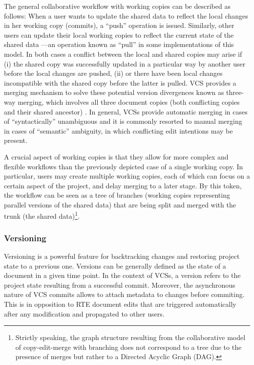 \documentclass{sig-alternate}
\begin{document}
The general collaborative workflow with working copies can be described as follows:
When a user wants to update the shared data to reflect the local changes in her working copy
(commits), a ``push'' operation is issued. Similarly, other users can update their local
working copies to reflect the current state of the shared data ---an operation
known as ``pull'' in some implementations of this model.
In both cases a conflict between the local and shared copies may arise if (i) the shared
copy was successfully updated in a particular way by another user before the local changes
are pushed, (ii) or there have been local changes incompatible with the shared copy before
the latter is pulled.
VCS provides a merging mechanism to solve these potential version divergences known as
three-way merging, which involves all three document copies (both conflicting copies and their
shared ancestor) \cite{Altmanninger2009}. In general, VCSs provide automatic merging in cases
of ``syntactically'' unambiguous and it is commonly resorted to manual merging in cases
of ``semantic'' ambiguity, in which conflicting edit intentions may be present.%

A crucial aspect of working copies is that they allow for more complex and flexible workflows
than the previously depicted case of a single working copy. In particular, users may create
multiple working copies, each of which can focus on a certain aspect of the project, and
delay merging to a later stage.
By this token, the workflow can be seen as a tree of branches (working copies
representing parallel versions of the shared data) that are being split and merged with
the trunk (the shared data)\footnote{
  Strictly speaking, the graph structure resulting from the collaborative model of copy-edit-merge
  with branching does not correspond to a tree due to the presence of merges but rather to a
  Directed Acyclic Graph (DAG).
}.

\subsubsection{Versioning}\label{subsec:versioning}
Versioning is a powerful feature for backtracking changes and restoring project state to a
previous one. Versions can be generally defined as the state of a document in a given time point.
In the context of VCSs, a version refers to the project state resulting from a successful commit.
Moreover, the asynchronous nature of VCS commits allows to attach metadata to changes before
commiting. This is in opposition to RTE document edits that are triggered automatically
after any modification and propagated to other users.
\end{document}
